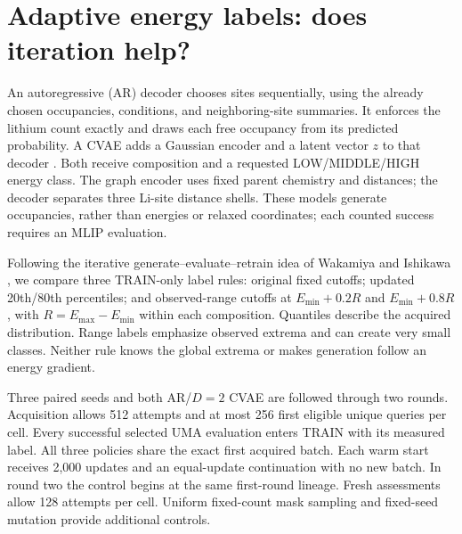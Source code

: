 \documentclass[11pt]{article}
\begin{document}
\section{Adaptive energy labels: does iteration help?}
An autoregressive (AR) decoder chooses sites sequentially, using the already
chosen occupancies, conditions, and neighboring-site summaries. It enforces
the lithium count exactly and draws each free occupancy from its predicted
probability. A CVAE adds a Gaussian encoder and a latent
vector $z$ to that decoder \cite{kingma}. Both receive composition and a
requested LOW/MIDDLE/HIGH energy class. The graph encoder uses fixed parent
chemistry and distances; the decoder separates three Li-site distance
shells. These models generate occupancies, rather than energies or relaxed
coordinates; each counted success requires an MLIP evaluation.

Following the iterative generate--evaluate--retrain idea of Wakamiya and
Ishikawa \cite{wakamiya}, we compare three TRAIN-only label rules: original
fixed cutoffs; updated 20th/80th percentiles; and observed-range cutoffs at
$E_{\min}+0.2R$ and $E_{\min}+0.8R$, with $R=E_{\max}-E_{\min}$ within each
composition. Quantiles describe the acquired distribution. Range labels
emphasize observed extrema and can create very small classes. Neither rule
knows the global extrema or makes generation follow an energy gradient.

Three paired seeds and both AR/$D=2$ CVAE are followed through two rounds.
Acquisition allows 512 attempts and at most 256 first eligible unique
queries per cell. Every successful selected UMA evaluation enters TRAIN with
its measured label. All three policies share the exact first acquired batch.
Each warm start receives 2,000 updates and an equal-update continuation with
no new batch. In round two the control begins at the same first-round
lineage. Fresh assessments allow 128 attempts per cell. Uniform fixed-count mask sampling
and fixed-seed mutation provide additional controls.


\end{document}
